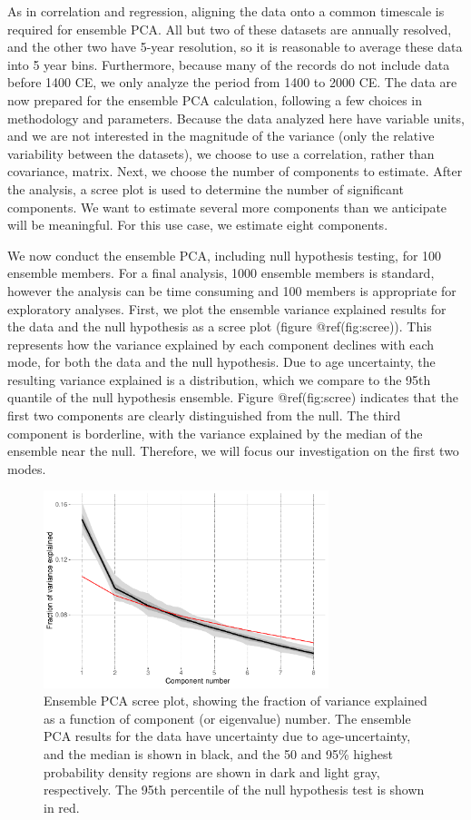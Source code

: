 \documentclass[gchron, manuscript]{copernicus}
\begin{document}
As in correlation and regression, aligning the data onto a common
timescale is required for ensemble PCA. All but two of these datasets
are annually resolved, and the other two have 5-year resolution, so it
is reasonable to average these data into 5 year bins. Furthermore,
because many of the records do not include data before 1400 CE, we only
analyze the period from 1400 to 2000 CE. The data are now prepared for
the ensemble PCA calculation, following a few choices in methodology and
parameters. Because the data analyzed here have variable units, and we
are not interested in the magnitude of the variance (only the relative
variability between the datasets), we choose to use a correlation,
rather than covariance, matrix. Next, we choose the number of components
to estimate. After the analysis, a scree plot is used to determine the
number of significant components. We want to estimate several more
components than we anticipate will be meaningful. For this use case, we
estimate eight components.

We now conduct the ensemble PCA, including null hypothesis testing, for
100 ensemble members. For a final analysis, 1000 ensemble members is
standard, however the analysis can be time consuming and 100 members is
appropriate for exploratory analyses. First, we plot the ensemble
variance explained results for the data and the null hypothesis as a
scree plot (figure @ref(fig:scree)). This represents how the variance
explained by each component declines with each mode, for both the data
and the null hypothesis. Due to age uncertainty, the resulting variance
explained is a distribution, which we compare to the 95th quantile of
the null hypothesis ensemble. Figure @ref(fig:scree) indicates that the
first two components are clearly distinguished from the null. The third
component is borderline, with the variance explained by the median of
the ensemble near the null. Therefore, we will focus our investigation
on the first two modes.

\begin{figure}
\includegraphics[width=8.3cm]{geoChronR-paper_files/figure-latex/scree-1} \caption{Ensemble PCA scree plot, showing the fraction of variance explained as a function of component (or eigenvalue) number. The ensemble PCA results for the data have uncertainty due to age-uncertainty, and the median is shown in black, and the 50 and 95\% highest probability density regions are shown in dark and light gray, respectively. The 95th percentile of the null hypothesis test is shown in red.}\label{fig:scree}
\end{figure}
\end{document}
